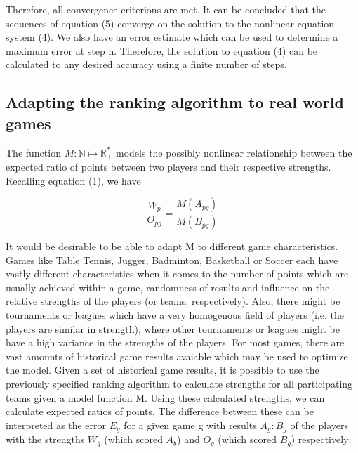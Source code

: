 \documentclass[a4paper]{article}
\begin{document}
Therefore, all convergence criterions are met. It can be concluded that the sequences of equation (5) converge on the solution
to the nonlinear equation system (4). We also have an error estimate which can be used to determine a maximum error at step n. 
Therefore, the solution to equation (4) can be calculated to any desired accuracy using a finite number of steps.

\subsection*{Adapting the ranking algorithm to real world games}

The function $ M : \mathbb{N} \mapsto \mathbb{R^*_+} $ models the possibly nonlinear relationship between the expected ratio of points
between two players and their respective strengths. Recalling equation (1), we have

$$
 \frac{W_p}{ O_{pg} } = \frac{M(A_{pg})}{M(B_{pg})}  
$$

It would be desirable to be able to adapt M to different game characteristics. Games like Table Tennis, Jugger, Badminton, 
Basketball or Soccer each have vastly different characteristics when it comes to the number of points which are usually achieved within a game,
randomness of results and influence on the relative strengths of the players (or teams, respectively). Also, there might be tournaments or leagues
which have a very homogenous field of players (i.e. the players are similar in strength), where other tournaments or leagues might be have a high variance in
the strengths of the players.
\newline
\newline
For most games, there are vast amounts of historical game results avaiable which may be used to optimize the model.
Given a set of historical game results, it is possible to use the previously specified ranking algorithm to calculate strengths for all participating teams given
a model function M. Using these calculated strengths, we can calculate expected ratios of points. The difference between these can be interpreted as the 
error $ E_g $ for a given game g with results $A_g:B_g$ of the players with the strengths $W_g$ (which scored $A_b$) and $O_g$ (which scored $B_g$) respectively:
\end{document}
